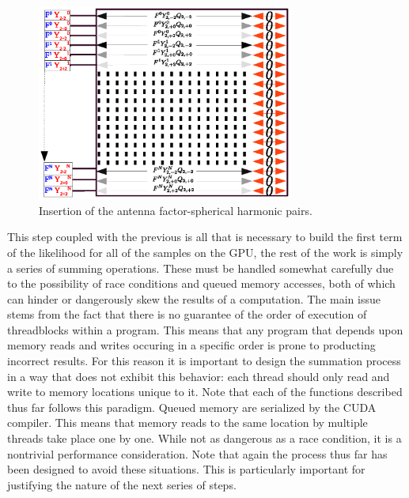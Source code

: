 \begin{figure}
\hspace{-5cm}
\vspace{-1cm}
  \begin{center}
    \includegraphics[trim={4cm, 13cm, 2cm, 3cm}, clip, width=0.75\textwidth]{FYrho.eps}
  \end{center}
  \caption{Insertion of the antenna factor-spherical harmonic pairs. }
\end{figure}

This step coupled with the previous is all that is necessary to build the first term of the likelihood for all of the samples on the GPU, the rest of the work is simply a series of summing operations. These must be handled somewhat carefully due to the possibility of race conditions and queued memory accesses, both of which can hinder or dangerously skew the results of a computation. 
The main issue stems from the fact that there is no guarantee of the order of execution of threadblocks within a program. This means that any program that depends upon memory reads and writes occuring in a specific order is prone to producting incorrect results. For this reason it is important to design the summation process in a way that does not exhibit this behavior: each thread should only read and write to memory locations unique to it. Note that each of the functions described thus far follows this paradigm.
Queued memory are serialized by the CUDA compiler. This means that memory reads to the same location by multiple threads take place one by one. While not as dangerous as a race condition, it is a nontrivial performance consideration. Note that again the process thus far has been designed to avoid these situations. This is particularly important for justifying the nature of the next series of steps.   

